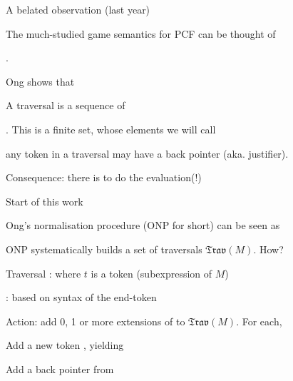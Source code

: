 \documentclass[12pt,fleqn,landscape]{article}
\begin{document}

\begin{slide}{A  belated  observation (last year)}

The much-studied game semantics for PCF can be thought of 

.
\vair

\bc
Ong \cite{ong2015} shows that
\ec
\vair


\bq
{}
\vair\vair

A traversal is a sequence of 
\vair
\bi
\item {}. This is a finite set, whose elements we will call 
\vair

\item any token in a traversal may have a back pointer (aka. justifier).
\ei
\eq

\vair\vair


Consequence: there is  to do the evaluation(!)
\vair

\hfill{}
\end{slide}


\begin{slide}{Start of this work}



Ong's normalisation procedure (ONP for short) can be seen as  
\vair

\bc{}
\ec
\vair



\bi

\item ONP systematically builds a set  of traversals $\mathfrak{Trav}(M)$. How?
\vair\vair

\item Traversal : \hfill {} \hair where $t$ is a token (subexpression  of $M$)
\vair\vair

\item  {}: based on syntax of the end-token 
\vair
\item Action: add  0, 1 or more extensions of  to  $\mathfrak{Trav}(M)$. For each,
\vair
\bi 
\item Add a new token , yielding 
\vair

\item Add a back pointer from  \hfill {}
\ei
 \ei


\end{slide}
\end{document}
